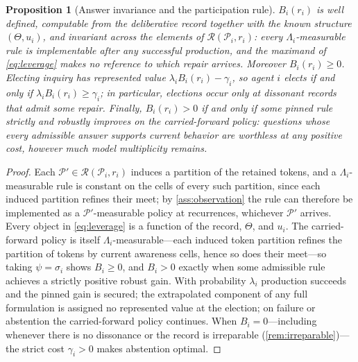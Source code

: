 \documentclass[11pt]{article}
\newtheorem{proposition}[assumption]{Proposition}
\theoremstyle{definition}
\begin{document}
\begin{proposition}[Answer invariance and the participation rule]
\label{prop:participation}
$B_i(r_i)$ is well defined, computable from the deliberative record together
with the known structure $(\Theta,u_i)$, and invariant across the elements
of $\mathcal R(\mathcal P_i,r_i)$: every $\Lambda_i$-measurable rule is
implementable after any successful production, and the maximand of
\cref{eq:leverage} makes no reference to which repair arrives.  Moreover
$B_i(r_i)\geq0$.  Electing inquiry has represented value
$\lambda_iB_i(r_i)-\gamma_i$, so agent $i$ elects if and only if
$\lambda_iB_i(r_i)\geq\gamma_i$; in particular, elections occur only at
dissonant records that admit some repair.  Finally, $B_i(r_i)>0$ if and only
if some pinned rule strictly and robustly improves on the carried-forward
policy: questions whose every admissible answer supports current behavior
are worthless at any positive cost, however much model multiplicity remains.
\end{proposition}

\begin{proof}
Each $\mathcal P'\in\mathcal R(\mathcal P_i,r_i)$ induces a partition of the
retained tokens, and a $\Lambda_i$-measurable rule is constant on the cells
of every such partition, since each induced partition refines their meet; by
\cref{ass:observation} the rule can therefore be implemented as a
$\mathcal P'$-measurable policy at recurrences, whichever $\mathcal P'$
arrives.  Every object in \cref{eq:leverage} is a function of the record,
$\Theta$, and $u_i$.  The carried-forward policy is itself
$\Lambda_i$-measurable---each induced token partition refines the partition
of tokens by current awareness cells, hence so does their meet---so taking
$\psi=\sigma_i$ shows $B_i\geq0$, and $B_i>0$ exactly when some admissible
rule achieves a strictly positive robust gain.  With probability $\lambda_i$
production succeeds and the pinned gain is secured; the extrapolated
component of any full formulation is assigned no represented value at the
election; on failure or abstention the carried-forward policy continues.
When $B_i=0$---including whenever there is no dissonance or the record is
irreparable (\cref{rem:irreparable})---the strict cost $\gamma_i>0$ makes
abstention optimal.
\end{proof}
\end{document}
